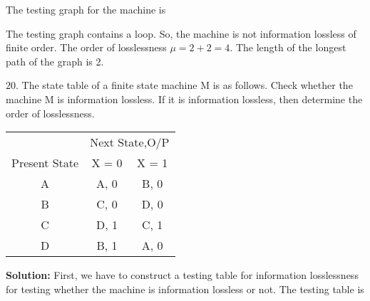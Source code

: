 \documentclass[a4,9pt]{beamer}
\begin{document}
\begin{frame}
\hspace*{0.1cm} The testing graph for the machine is

\pause
\begin{center}
\end{center}

\pause
\hspace*{0.1cm} The testing graph contains a loop. So, the machine is not information lossless of finite order. The order of losslessness $\mu = 2 + 2 = 4$. The length of the longest path of the graph is 2.
\end{frame}

\begin{frame}
$20.$ The state table of a finite state machine M is as follows. Check whether the machine M is information lossless. If it is information lossless, then determine the order of losslessness.\\

\begin{flushright}
  [WBUT 2003]
\end{flushright}
\vspace*{0.1cm}

\pause
\begin{center}
  \begin{tabular}{ccc}
\hline

\hline

\hline

\hline
 & \multicolumn{2}{c}{Next State,O/P}\\
 \cline{2-3}
Present State & X = 0 & X = 1\\
\hline
 A    &   A, 0   &   B, 0  \\
 B    &   C, 0   &   D, 0  \\
 C    &   D, 1   &   C, 1  \\
 D    &   B, 1   &   A, 0  \\
\hline

\hline

\hline

\hline

  \end{tabular}
\end{center}
\vspace*{0.1cm}

\pause
\large{\textbf{Solution:}} \small{First, we have to construct a testing table for information losslessness for testing whether the machine is information lossless or not. The testing table is}



\end{frame}
\end{document}
